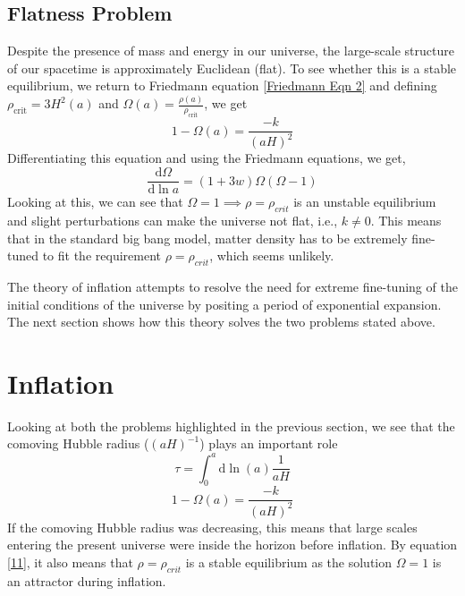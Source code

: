 \documentclass[aps,prd,reprint,preprintnumbers,showpacs,floatfix,nofootinbib,superscript address]{revtex4-2}
\begin{document}
\subsection{Flatness Problem} \label{Flatness Problem}
Despite the presence of mass and energy in our universe, the large-scale structure of our spacetime is approximately Euclidean (flat). To see whether this is a stable equilibrium, we return to Friedmann equation \ref{Friedmann Eqn 2} and defining $\rho_{\text{crit}} = 3H^2(a)$ and $\Omega(a) = \frac{\rho(a)}{\rho_{\text{crit}}}$, we get
\begin{equation}
    1 - \Omega(a) = \frac{-k}{(aH)^2}
\end{equation}
Differentiating this equation and using the Friedmann equations, we get,
\begin{equation}
    \frac{\mathrm{d}\Omega}{\mathrm{d} \ln a} = (1+3w)\Omega(\Omega-1)
\end{equation}
Looking at this, we can see that $\Omega = 1  \implies \rho = \rho_{crit}$ is an unstable equilibrium and slight perturbations can make the universe not flat, i.e., $k \neq 0$. This means that in the standard big bang model, matter density has to be extremely fine-tuned to fit the requirement $\rho = \rho_{crit}$, which seems unlikely.

The theory of inflation attempts to resolve the need for extreme fine-tuning of the initial conditions of the universe by positing a period of exponential expansion. The next section shows how this theory solves the two problems stated above.

\section{Inflation}\label{Inflation}
Looking at both the problems highlighted in the previous section, we see that the comoving Hubble radius ($(aH)^{-1}$) plays an important role
\begin{equation}    \label{10}
    \tau = \int_{0}^{a} \mathrm{d} \ln (a) \frac{1}{aH}
\end{equation}
\begin{equation} \label{11}
    1 - \Omega (a) = \frac{-k}{(aH)^2}
\end{equation}
If the comoving Hubble radius was decreasing, this means that large scales entering the present universe were inside the horizon before inflation. By equation \ref{11}, it also means that $\rho = \rho_{crit}$ is a stable equilibrium as the solution $\Omega = 1$ is an attractor during inflation.
\end{document}
